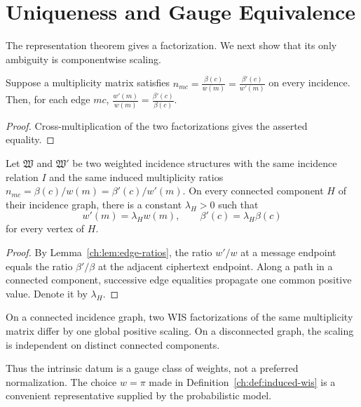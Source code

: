 ﻿\chapter[Uniqueness and Gauge]{Uniqueness and Gauge Equivalence}\label{ch:sec:gauge}
The representation theorem gives a factorization. We next show that its only ambiguity is componentwise scaling.
\begin{lemma}\label{ch:lem:edge-ratios}
Suppose a multiplicity matrix satisfies $n_{mc}=\frac{\beta(c)}{w(m)}=\frac{\beta'(c)}{w'(m)}$ on every incidence. Then, for each edge $mc$,
$\frac{w'(m)}{w(m)}=\frac{\beta'(c)}{\beta(c)}.$
\end{lemma}
\begin{proof}
Cross-multiplication of the two factorizations gives the asserted equality.
\end{proof}

\begin{theorem}\label{ch:thm:uniqueness}
Let $\mathfrak W$ and $\mathfrak W'$ be two weighted incidence structures with the same incidence relation $I$ and the same induced multiplicity ratios $n_{mc}=\beta(c)/w(m)=\beta'(c)/w'(m)$. On every connected component $H$ of their incidence graph, there is a constant $\lambda_H>0$ such that
\[
 w'(m)=\lambda_Hw(m),\qquad
 \beta'(c)=\lambda_H\beta(c)
\]
for every vertex of $H$.
\end{theorem}
\begin{proof}
By Lemma~\ref{ch:lem:edge-ratios}, the ratio $w'/w$ at a message endpoint equals the ratio $\beta'/\beta$ at the adjacent ciphertext endpoint. Along a path in a connected component, successive edge equalities propagate one common positive value. Denote it by $\lambda_H$.
\end{proof}

\begin{corollary}\label{ch:cor:gauge}
On a connected incidence graph, two WIS factorizations of the same multiplicity matrix differ by one global positive scaling. On a disconnected graph, the scaling is independent on distinct connected components.
\end{corollary}
Thus the intrinsic datum is a gauge class of weights, not a preferred normalization. The choice $w=\pi$ made in Definition~\ref{ch:def:induced-wis} is a convenient representative supplied by the probabilistic model.
